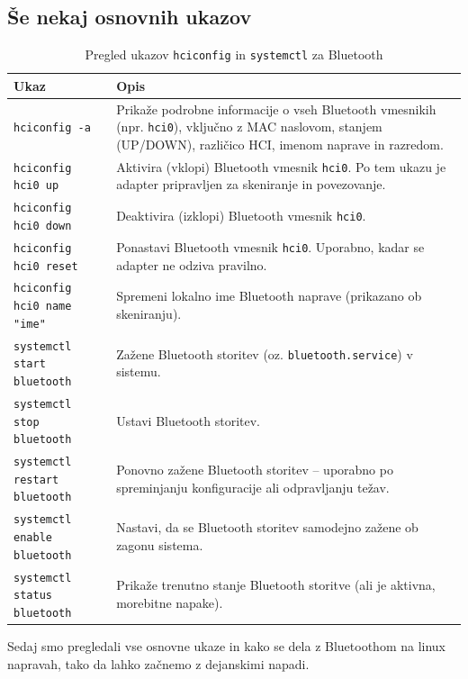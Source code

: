 \documentclass[11pt,a4paper,slovene]{article}
\begin{document}
\subsection{Še nekaj osnovnih ukazov}
\begin{table}[H]
	\centering
	\small
	\renewcommand{\arraystretch}{1.2}
	\begin{tabularx}{\linewidth}{|l|X|}
		\hline
		\textbf{Ukaz} & \textbf{Opis} \\
		\hline
		\texttt{hciconfig -a} & Prikaže podrobne informacije o vseh Bluetooth vmesnikih (npr. \texttt{hci0}), vključno z MAC naslovom, stanjem (UP/DOWN), različico HCI, imenom naprave in razredom. \\
		\hline
		\texttt{hciconfig hci0 up} & Aktivira (vklopi) Bluetooth vmesnik \texttt{hci0}. Po tem ukazu je adapter pripravljen za skeniranje in povezovanje. \\
		\hline
		\texttt{hciconfig hci0 down} & Deaktivira (izklopi) Bluetooth vmesnik \texttt{hci0}. \\
		\hline
		\texttt{hciconfig hci0 reset} & Ponastavi Bluetooth vmesnik \texttt{hci0}. Uporabno, kadar se adapter ne odziva pravilno. \\
		\hline
		\texttt{hciconfig hci0 name "ime"} & Spremeni lokalno ime Bluetooth naprave (prikazano ob skeniranju). \\
		\hline
		\texttt{systemctl start bluetooth} & Zažene Bluetooth storitev (oz. \texttt{bluetooth.service}) v sistemu. \\
		\hline
		\texttt{systemctl stop bluetooth} & Ustavi Bluetooth storitev. \\
		\hline
		\texttt{systemctl restart bluetooth} & Ponovno zažene Bluetooth storitev – uporabno po spreminjanju konfiguracije ali odpravljanju težav. \\
		\hline
		\texttt{systemctl enable bluetooth} & Nastavi, da se Bluetooth storitev samodejno zažene ob zagonu sistema. \\
		\hline
		\texttt{systemctl status bluetooth} & Prikaže trenutno stanje Bluetooth storitve (ali je aktivna, morebitne napake). \\
		\hline
	\end{tabularx}
	\caption{Pregled ukazov \texttt{hciconfig} in \texttt{systemctl} za Bluetooth}
	\label{tab:hciconfig-systemctl}
\end{table}

Sedaj smo pregledali vse osnovne ukaze in kako se dela z Bluetoothom na linux napravah, tako da lahko začnemo z dejanskimi napadi.
\end{document}
